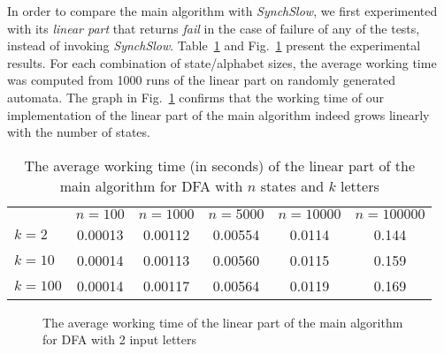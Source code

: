 \documentclass{llncs}
\begin{document}
In order to compare the main algorithm with \emph{SynchSlow}, we first experimented with its \emph{linear part} that returns \emph{fail} in the case of failure of any of the tests, instead of invoking \emph{SynchSlow}. Table~\ref{tab:avgtime} and Fig.~\ref{fig:avgtime} present the experimental results. For each combination of state/alphabet sizes, the average working time was computed from 1000 runs of the linear part on randomly generated automata. The graph in Fig.~\ref{fig:avgtime} confirms that the working time of our implementation of the linear part of the main algorithm indeed grows linearly with the number of states.
\begin{table}
\caption{The average working time (in seconds) of the linear part of the main algorithm for DFA with $n$ states and $k$ letters}
\centering
\begin{tabular}{l|c|c|c|c|c}
\hline\noalign{\smallskip}
&\quad $n=100$ \quad & \quad $n=1000$\quad  &\quad  $n=5000$\quad  &\quad  $n=10000$ \quad & \quad $n=100000$\\
\noalign{\smallskip}
\hline
\noalign{\smallskip}
  $k=2$ & 0.00013 & 0.00112 & 0.00554 & 0.0114 & 0.144\\
 $k=10$ & 0.00014 & 0.00113 & 0.00560 & 0.0115 & 0.159\\
$k=100$ \quad & 0.00014 & 0.00117 & 0.00564 & 0.0119 & 0.169\\
\hline
\end{tabular}
\label{tab:avgtime}
\end{table}

\begin{figure}[h]
\centering
{}
\caption{The average working time of the linear part of the main algorithm for DFA with 2 input letters}
\label{fig:avgtime}
\end{figure}
\end{document}
